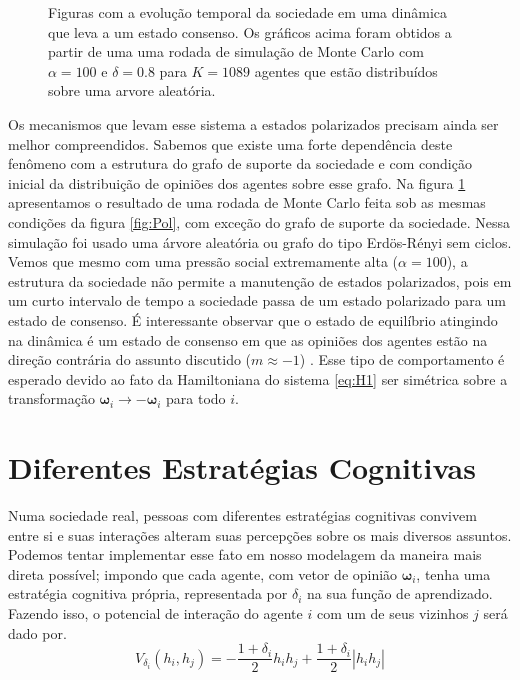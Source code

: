 \begin{figure}
\begin{subfigure}[]{0.75\textwidth}
\end{subfigure}
\newline
\caption{
    Figuras com a evolução temporal da sociedade em uma dinâmica que leva
    a um estado consenso. Os gráficos acima foram obtidos a partir de uma uma
    rodada de simulação de Monte Carlo com $\alpha = 100$ e $\delta = 0.8$ para
    $K = 1089$ agentes que estão distribuídos sobre uma arvore aleatória.
}
\label{fig:Arvore}
\end{figure}

Os mecanismos que levam esse sistema a estados polarizados precisam ainda
ser melhor compreendidos. Sabemos que existe uma forte dependência deste
fenômeno com a estrutura do grafo de suporte da sociedade e com condição
inicial da distribuição de opiniões dos agentes sobre esse grafo. Na
figura \ref{fig:Arvore} apresentamos o resultado de uma rodada de Monte
Carlo feita sob as mesmas condições da figura \ref{fig:Pol}, com exceção
do grafo de suporte da sociedade. Nessa simulação foi usado uma árvore
aleatória ou grafo do tipo Erdös-Rényi sem ciclos. Vemos que mesmo
com uma pressão social extremamente alta ($\alpha = 100$), a estrutura da
sociedade não permite a manutenção de estados polarizados, pois em um
curto intervalo de tempo a sociedade passa de um estado polarizado para um
estado de consenso.  É interessante observar que o estado de equilíbrio
atingindo na dinâmica é um estado de consenso em que as opiniões dos
agentes estão na direção contrária do assunto discutido ($m \approx -1$)
. Esse tipo de comportamento é esperado devido ao fato da Hamiltoniana do
sistema \ref{eq:H1} ser simétrica sobre a transformação $\bm{\omega}_i
\rightarrow -\bm{\omega}_i$ para todo $i$.


\newpage
\section{Diferentes Estratégias Cognitivas} %
\label{sec:dd}

Numa sociedade real, pessoas com diferentes estratégias cognitivas convivem
entre si e suas interações alteram suas percepções sobre os mais diversos
assuntos. Podemos tentar implementar esse fato em nosso modelagem da maneira
mais direta possível; impondo que cada agente, com vetor de opinião
$\bm{\omega}_i$, tenha uma estratégia cognitiva própria, representada por
$\delta_i$ na sua função de aprendizado.  Fazendo isso, o potencial de
interação do agente $i$ com um de seus vizinhos $j$ será dado por.
\begin{equation}
V_{\delta_i}\left(h_i,h_j\right) = -\frac{1 + \delta_i}{2}h_ih_j 
        + \frac{1 + \delta_i}{2}\left|h_ih_j\right| 
\end{equation}


